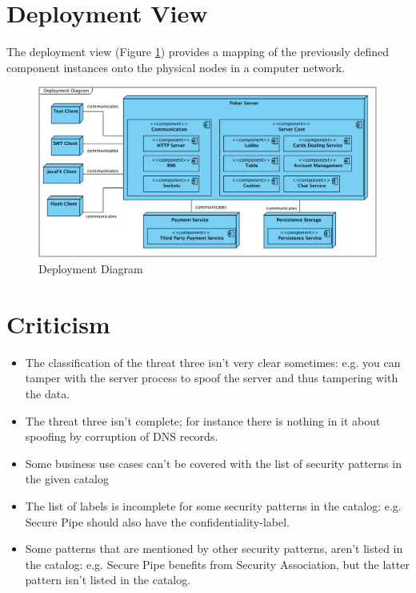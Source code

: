 \documentclass[a4paper,11pt]{report}
\begin{document}
\section{Deployment View}
The deployment view (Figure \ref{fig:deployment}) provides a mapping of the previously defined component instances onto the physical nodes in a computer network. 
\begin{figure}
  \begin{center}
    \includegraphics[angle=90, scale=0.6]{img_deployment_diagram.png}
  \end{center}
  \caption{Deployment Diagram}\label{fig:deployment}
\end{figure}
\section{Criticism}
\begin{itemize}
\item The classification of the threat three isn't very clear sometimes: e.g. you can tamper with the server process
to spoof the server and thus tampering with the data.
\item The threat three isn't complete; for instance there is nothing in it about spoofing by corruption of 
DNS records.
\item Some business use cases can't be covered with the list of security patterns in the given catalog
\item The list of labels is incomplete for some security patterns in the catalog: e.g. Secure Pipe should also have
the confidentiality-label.
\item Some patterns that are mentioned by other security patterns, aren't listed in the catalog: e.g. Secure Pipe 
benefits from Security Association, but the latter pattern isn't listed in the catalog.
\end{itemize}
\end{document}
